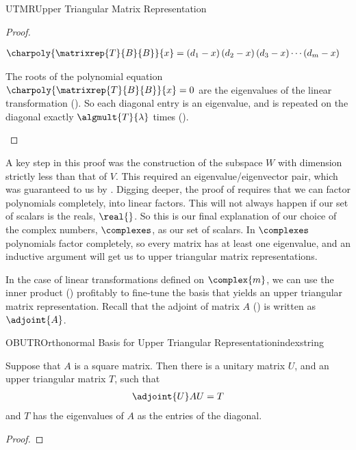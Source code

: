 \begin{subsect}{UTMR}{Upper Triangular Matrix Representation}
\begin{proof}
\begin{para}
%
\begin{align*}
\charpoly{\matrixrep{T}{B}{B}}{x}&=
\left(d_1-x\right)
\left(d_2-x\right)
\left(d_3-x\right)
\cdots
\left(d_m-x\right)
\end{align*}
\end{para}
%
\begin{para}The roots of the polynomial equation $\charpoly{\matrixrep{T}{B}{B}}{x}=0$ are the eigenvalues of the linear transformation ().  So each diagonal entry is an eigenvalue, and is repeated on the diagonal exactly $\algmult{T}{\lambda}$ times ().\end{para}
%
\end{proof}
%
\begin{para}A key step in this proof was the construction of the subspace $W$ with dimension strictly less than that of $V$.  This required an eigenvalue/eigenvector pair, which was guaranteed to us by .  Digging deeper, the proof of  requires that we can factor polynomials completely, into linear factors.  This will not always happen if our set of scalars is the reals, $\real{\null}$.  So this is our final explanation of our choice of the complex numbers, $\complexes$, as our set of scalars.  In $\complexes$ polynomials factor completely, so every matrix has at least one eigenvalue, and an inductive argument will get us to upper triangular matrix representations.\end{para}
%
\begin{para}In the case of linear transformations defined on $\complex{m}$, we can use the inner product () profitably to fine-tune the basis that yields an upper triangular matrix representation.  Recall that the adjoint of matrix $A$ () is written as $\adjoint{A}$.\end{para}
%
\begin{theorem}{OBUTR}{Orthonormal Basis for Upper Triangular Representation}{indexstring}
\begin{para}Suppose that $A$ is a square matrix.  Then there is a unitary matrix $U$, and an upper triangular matrix $T$, such that
%
\begin{align*}
\adjoint{U}AU=T
\end{align*}
%
and $T$ has the eigenvalues of $A$ as the entries of the diagonal.\end{para}
\end{theorem}
%
\begin{proof}

\end{proof}
\end{subsect}
